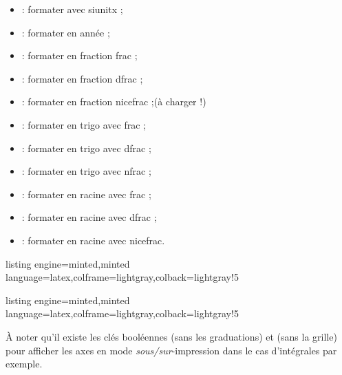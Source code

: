 \documentclass[11pt,a4paper]{ltxdoc}
\begin{document}
\begin{itemize}
  \item {} : formater avec \textsf{siunitx} ;
  \item {} : formater en année ;
  \item {} : formater en fraction \textsf{frac} ;
  \item {} : formater en fraction \textsf{dfrac} ;
  \item {} : formater en fraction \textsf{nicefrac} ;\hfill(à charger !)
  \item {} : formater en trigo avec \textsf{frac} ;
  \item {} : formater en trigo avec \textsf{dfrac} ;
  \item {} : formater en trigo avec \textsf{nfrac} ;
  \item {} : formater en racine avec \textsf{frac} ;
  \item {} : formater en racine avec \textsf{dfrac} ;
  \item {} : formater en racine avec \textsf{nicefrac}.
\end{itemize}

\smallskip

\begin{tcblisting}{listing engine=minted,minted language=latex,colframe=lightgray,colback=lightgray!5}
\begin{GraphiqueTikz}
  [x=0.075cm,y=0.03cm,Xmin=0,Xmax=160,Xgrille=20,Xgrilles=10,
  Origy=250,Ymin=250,Ymax=400,Ygrille=25,Ygrilles=5]
\end{GraphiqueTikz}
\end{tcblisting}

\begin{tcblisting}{listing engine=minted,minted language=latex,colframe=lightgray,colback=lightgray!5}
\begin{GraphiqueTikz}%
  [x=0.9cm,y=0.425cm,Xmin=4,Xmax=20,Origx=4,
  Ymin=40,Ymax=56,Ygrille=2,Ygrilles=1,Origy=40]
\end{GraphiqueTikz}
\end{tcblisting}

À noter qu'il existe les clés booléennes \MontreCode{[Derriere]} (sans les graduations) et \MontreCode{[Devant]} (sans la grille) pour afficher les axes en mode \textit{sous/sur}-impression dans le cas d'intégrales par exemple.
\end{document}
